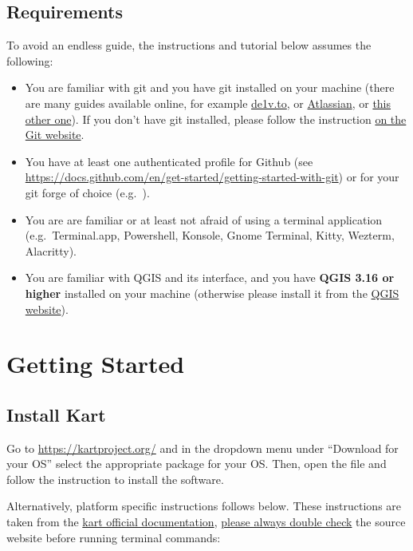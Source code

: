\documentclass[
  letterpaper,
  DIV=11,
  numbers=noendperiod]{scrartcl}
\begin{document}
\subsection{Requirements}\label{sec-requirements}

To avoid an endless guide, the instructions and tutorial below assumes
the following:

\begin{itemize}
\item
  You are familiar with git and you have git installed on your machine
  (there are many guides available online, for example
  \href{https://dev.to/jitendrachoudhary/understanding-git-a-beginners-guide-to-version-control-with-visuals-5cbf}{de1v.to},
  or \href{https://www.atlassian.com/git}{Atlassian}, or
  \href{https://rogerdudler.github.io/git-guide/index.html}{this other
  one}). If you don't have git installed, please follow the instruction
  \href{https://git-scm.com/}{on the Git website}.
\item
  You have at least one authenticated profile for Github (see
  \url{https://docs.github.com/en/get-started/getting-started-with-git})
  or for your git forge of choice (e.g.~).
\item
  You are are familiar or at least not afraid of using a terminal
  application (e.g.~Terminal.app, Powershell, Konsole, Gnome Terminal,
  Kitty, Wezterm, Alacritty).
\item
  You are familiar with QGIS and its interface, and you have
  \textbf{QGIS 3.16 or higher} installed on your machine (otherwise
  please install it from the \href{https://qgis.org}{QGIS website}).
\end{itemize}

\section{Getting Started}\label{sec-getting-started}

\subsection{Install Kart}\label{sec-install-kart}

Go to \url{https://kartproject.org/} and in the dropdown menu under
``Download for your OS'' select the appropriate package for your OS.
Then, open the file and follow the instruction to install the software.

Alternatively, platform specific instructions follows below. These
instructions are taken from the
\href{https://docs.kartproject.org/en/latest/pages/quick_guide.html\#installing}{kart
official documentation}, \ul{please always double check} the source
website before running terminal commands:
\end{document}
